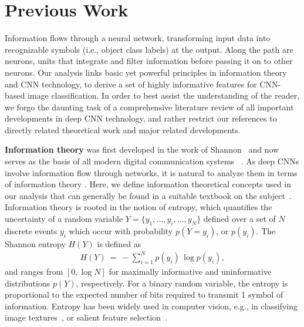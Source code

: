 \documentclass[10pt,onecolumn]{article}
\begin{document}
\section{Previous Work}

Information flows through a neural network, transforming input data into recognizable symbols (i.e., object class labels) at the output. Along the path are neurons, units that integrate and filter information before passing it on to other neurons. Our analysis links basic yet powerful principles in information theory and CNN technology, to derive a set of highly informative features for CNN-based image classification. In order to best assist the understanding of the reader, we forgo the daunting task of a comprehensive literature review of all important developments in deep CNN technology, and rather restrict our references to directly related theoretical work and major related developments.

\textbf{Information theory} was first developed in the work of Shannon~\cite{shannon2001mathematical} and now serves as the basis of all modern digital communication systems ~\cite{cover2012elements}. As deep CNNs involve information flow through networks, it is natural to analyze them in terms of information theory \cite{murata1994network,bell1997independent}. Here, we define information theoretical concepts used in our analysis that can generally be found in a suitable textbook on the subject~\cite{cover2012elements}. Information theory is rooted in the notion of entropy, which quantifies the uncertainty of a random variable $Y=\{y_1, \dots, y_i, \dots, y_N\}$ defined over a set of $N$ discrete events $y_i$ which occur with probability $p(Y=y_i)$, or $p(y_i)$. The Shannon entropy $H(Y)$ is defined as
\begin{align}
	H(Y) \ = \ - \sum_{i=1}^N p(y_i) \, \log p(y_i),
\end{align}
and ranges from $[0,\log N]$ for maximally informative and uninformative distributions $p(Y)$, respectively. For a binary random variable, the entropy is proportional to the expected number of bits required to transmit 1 symbol of information. %
Entropy has been widely used in computer vision, e.g., in classifying image textures~\cite{haralick1973textural}, or salient feature selection~\cite{kadir2001saliency,toews2003entropy}.
\end{document}
